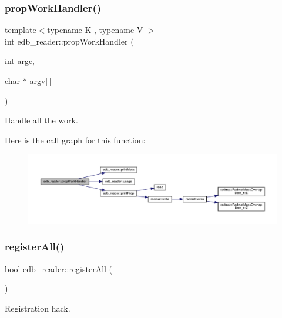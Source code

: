 \subsubsection{\texorpdfstring{propWorkHandler()}{propWorkHandler()}\hspace{0.1cm}{\footnotesize\ttfamily [2/2]}}
{\footnotesize\ttfamily template$<$typename K , typename V $>$ \\
int edb\+\_\+reader\+::prop\+Work\+Handler (\begin{DoxyParamCaption}\item[{int}]{argc,  }\item[{char $\ast$}]{argv\mbox{[}$\,$\mbox{]} }\end{DoxyParamCaption})}



Handle all the work. 

Here is the call graph for this function\+:
\nopagebreak
\begin{figure}[H]
\begin{center}
\leavevmode
\includegraphics[width=350pt]{d8/d4f/namespaceedb__reader_a2d373bb444230e1ed02c918c196f1d39_cgraph}
\end{center}
\end{figure}
\mbox{\label{namespaceedb__reader_abc5253cfecd30dd91009a5b4d96a3306}} 
\subsubsection{\texorpdfstring{registerAll()}{registerAll()}}
{\footnotesize\ttfamily bool edb\+\_\+reader\+::register\+All (\begin{DoxyParamCaption}{ }\end{DoxyParamCaption})}



Registration hack. 

\mbox{\label{namespaceedb__reader_a813c5a58e50141034390e821ed895942}} 
